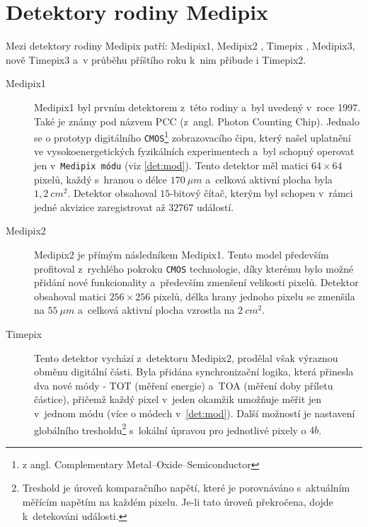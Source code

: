 \section{Detektory rodiny Medipix}\label{det:med}
Mezi detektory rodiny Medipix patří: Medipix1, Medipix2 \cite{Llopart-medipix2}, Timepix \cite{Llopart2008106}, Medipix3, nově Timepix3 \cite{timepix3} a~v průběhu příštího roku k~nim přibude i Timepix2. 

\begin{description}
	\item[Medipix1] Medipix1 byl prvním detektorem z~této rodiny a~byl uvedený v~roce 1997. Také je známy pod názvem PCC (z~angl. Photon Counting Chip). Jednalo se o prototyp digitálního \texttt{CMOS}\footnote{z angl. Complementary Metal–Oxide–Semiconductor} zobrazovacího čipu, který našel uplatnění ve vysokoenergetických fyzikálních experimentech \cite{medipix-www} a~byl schopný operovat jen v~\texttt{Medipix módu} (viz \ref{det:mod}). Tento detektor měl matici $64\times64$ pixelů, každý s~hranou o délce $170~\mu m$ a~celková aktivní plocha byla $1,2~cm^2$. Detektor obsahoval $15$-bitový čítač, kterým byl schopen v~rámci jedné akvizice zaregistrovat až $32767$ událostí.

	\item[Medipix2] Medipix2 je přímým následníkem Medipix1. Tento model především profitoval z~rychlého pokroku \texttt{CMOS} technologie, díky kterému bylo možné přidání nové funkcionality a~především zmenšení velikosti pixelů. Detektor obsahoval matici $256\times256$ pixelů, délka hrany jednoho pixelu se zmenšila na $55~\mu m$ a~celková aktivní plocha vzrostla na $2~cm^2$.

	\item[Timepix]\label{det:tim} Tento detektor vychází z~detektoru Medipix2, prodělal však výraznou obměnu digitální části. Byla přidána synchronizační logika, která přinesla dva nové módy - TOT (měření energie) a~TOA (měření doby příletu částice), přičemž každý pixel v~jeden okamžik umožňuje měřit jen v~jednom módu
	(více o módech v~\ref{det:mod}). Další možností je nastavení globálního tresholdu\footnote{Treshold je úroveň komparačního napětí, které je porovnáváno s~aktuálním měřícím napětím na každém pixelu. Je-li tato úroveň překročena, dojde k~detekováni události.} s~lokální úpravou pro jednotlivé pixely o $4 b$. 


\end{description}
